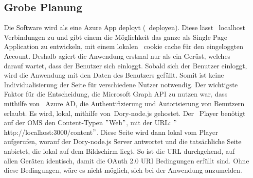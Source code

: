 \subsection{Grobe Planung}\label{subsec:grobe-planung}
Die Software wird als eine Azure App deployt (~\gls{deployen}).
Diese lässt ~\gls{localhost} Verbindungen zu und gibt einem die Möglichkeit das ganze als Single Page Application zu entwickeln, mit einem lokalen ~\gls{cookie cache} für den eingeloggten Account.
Deshalb agiert die Anwendung erstmal nur als ein Gerüst, welches darauf wartet, dass der Benutzer sich einloggt.
Sobald sich der Benutzer einloggt, wird die Anwendung mit den Daten des Benutzers gefüllt.
Somit ist keine Individualisierung der Seite für verschiedene Nutzer notwendig.
\newline
{}
Der wichtigste Faktor für die Entscheidung, die Microsoft Graph API zu nutzen war, dass mithilfe von ~\gls{Azure AD}, die Authentifizierung und Autorisierung von Benutzern erlaubt.
Es wird, lokal, mithilfe von~\gls{Dory-node.js} gehostet.
\newline
Der ~\gls{Player} benötigt auf der OMS den Content-Typen \("\)Web\("\),
\newline
mit der URL: \("\)http://localhost:3000/content\("\).
Diese Seite wird dann lokal vom Player aufgerufen, worauf der Dory-node.js Server antwortet und die tatsächliche Seite anbietet, die lokal auf dem Bildschirm liegt.
So ist die URL durchgehend, auf allen Geräten identisch, damit die OAuth 2.0 URI Bedingungen erfüllt sind.
Ohne diese Bedingungen, wäre es nicht möglich, sich bei der Anwendung anzumelden.
\newline
\newline
\newline
\pagebreak


